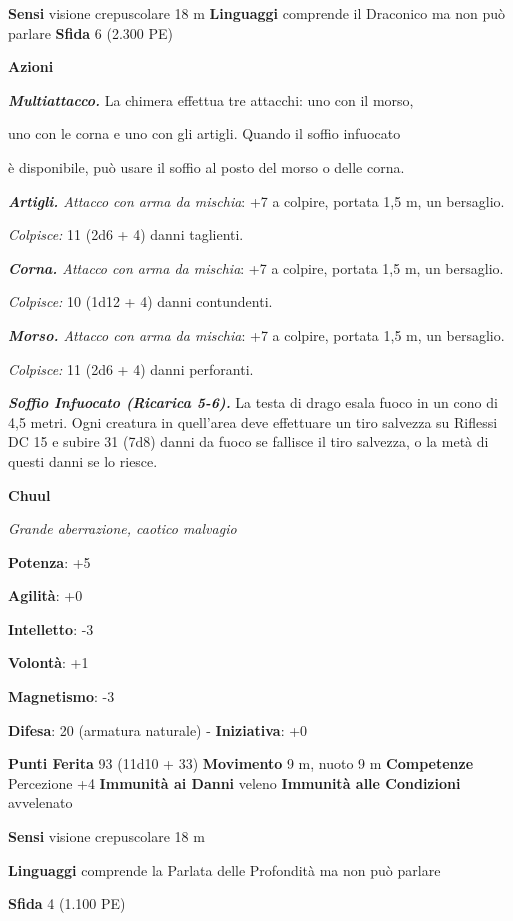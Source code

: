 \begin{multicols}{2}
\textbf{Sensi} visione crepuscolare 18 m
\textbf{Linguaggi} comprende il Draconico ma non può parlare
\textbf{Sfida} 6 (2.300 PE)

\textbf{Azioni}

\emph{\textbf{Multiattacco.}} La chimera effettua tre attacchi: uno con
il morso,

uno con le corna e uno con gli artigli. Quando il soffio infuocato

è disponibile, può usare il soffio al posto del morso o delle corna.

\emph{\textbf{Artigli.} Attacco con arma da mischia}: +7 a colpire,
portata 1,5 m, un bersaglio.

\emph{Colpisce:} 11 (2d6 + 4) danni taglienti.

\emph{\textbf{Corna.} Attacco con arma da mischia}: +7 a colpire,
portata 1,5 m, un bersaglio.

\emph{Colpisce:} 10 (1d12 + 4) danni contundenti.

\emph{\textbf{Morso.} Attacco con arma da mischia}: +7 a colpire,
portata 1,5 m, un bersaglio.

\emph{Colpisce:} 11 (2d6 + 4) danni perforanti.

\emph{\textbf{Soffio Infuocato (Ricarica 5-6).}} La testa di drago esala
fuoco in un cono di 4,5 metri. Ogni creatura in quell'area deve
effettuare un tiro salvezza su Riflessi DC 15 e subire 31 (7d8) danni
da fuoco se fallisce il tiro salvezza, o la metà di questi danni se lo
riesce.

\textbf{Chuul}

\emph{Grande aberrazione, caotico malvagio}

\textbf{Potenza}: +5

\textbf{Agilità}: +0

\textbf{Intelletto}: -3

\textbf{Volontà}: +1

\textbf{Magnetismo}: -3

\textbf{Difesa}: 20 (armatura naturale) - \textbf{Iniziativa}: +0

\textbf{Punti Ferita} 93 (11d10 + 33) \textbf{Movimento} 9 m, nuoto 9 m
\textbf{Competenze} Percezione +4 \textbf{Immunità ai Danni} veleno
\textbf{Immunità alle Condizioni} avvelenato

\textbf{Sensi} visione crepuscolare 18 m

\textbf{Linguaggi} comprende la Parlata delle Profondità ma non può
parlare

\textbf{Sfida} 4 (1.100 PE)


\end{multicols}
